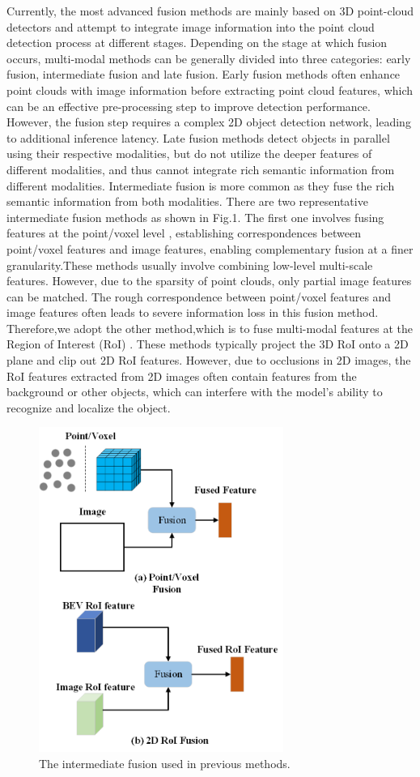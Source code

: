 \begin{sloppypar}
Currently, the most advanced fusion methods are mainly based on 3D point-cloud detectors and attempt to integrate image information into the point cloud detection process at different stages. Depending on the stage at which fusion occurs, multi-modal methods can be generally divided into three categories: early fusion, intermediate fusion and late fusion\cite{34}. Early fusion methods often enhance point clouds with image information before extracting point cloud features, which can be an effective pre-processing step to improve detection performance. However, the fusion step requires a complex 2D object detection network, leading to additional inference latency. Late fusion methods detect objects in parallel using their respective modalities, but do not utilize the deeper features of different modalities, and thus cannot integrate rich semantic information from different modalities. Intermediate fusion is more common as they fuse the rich semantic information from both modalities. There are two representative intermediate fusion methods as shown in Fig.1. The first one involves fusing features at the point/voxel level \cite{11}\cite{26}, establishing correspondences between point/voxel features and image features, enabling complementary fusion at a finer granularity.These methods usually involve combining low-level multi-scale features. However, due to the sparsity of point clouds, only partial image features can be matched. The rough correspondence between point/voxel features and image features often leads to severe information loss in this fusion method. Therefore,we adopt the other method,which is to fuse multi-modal features at the Region of Interest (RoI) \cite{12,13}. These methods typically project the 3D RoI onto a 2D plane and clip out 2D RoI features. However, due to occlusions in 2D images, the  RoI features extracted from 2D images often contain features from the background or other objects, which can interfere with the model's ability to recognize and localize the object.

\begin{figure}[h]
\centering
\includegraphics[width=8cm]{new_images/fig10.png}
\caption{The intermediate fusion used in previous methods.}
\label{fig_sim}
\end{figure}


\end{sloppypar}
